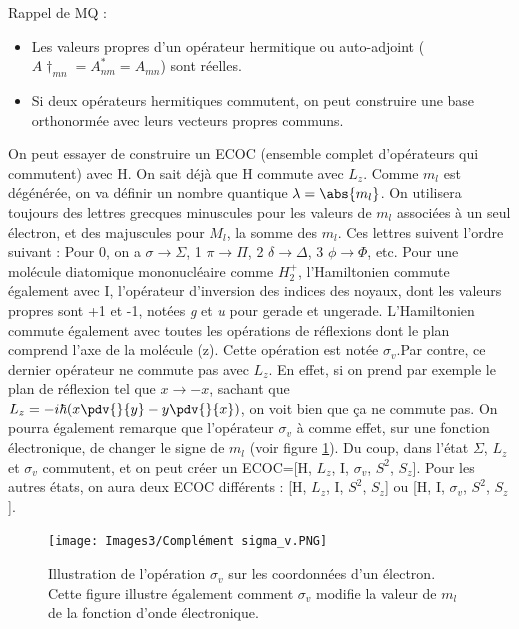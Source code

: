Rappel de MQ :
\begin{itemize}
    \item Les valeurs propres d'un opérateur hermitique ou auto-adjoint ($A\dagger_{mn} = A^*_{nm} = A_{mn}$) sont réelles.
    \item Si deux opérateurs hermitiques commutent, on peut construire une base orthonormée avec leurs vecteurs propres communs.
\end{itemize}
On peut essayer de construire un ECOC (ensemble complet d'opérateurs qui commutent) avec H.\newline
On sait déjà que H commute avec $L_z$. Comme $m_l$ est dégénérée, on va définir un nombre quantique $\lambda = \abs{m_l}$. On utilisera toujours des lettres grecques minuscules pour les valeurs de $m_l$ associées à un seul électron, et des majuscules pour $M_l$, la somme des $m_l$. Ces lettres suivent l'ordre suivant : \newline
Pour 0, on a $\sigma \rightarrow\Sigma$, 1 $\pi\rightarrow\Pi$, 2 $\delta\rightarrow\Delta$, 3 $\phi\rightarrow\Phi$, etc.\newline
Pour une molécule diatomique mononucléaire comme $H_2^+$, l'Hamiltonien commute également avec I, l'opérateur d'inversion des indices des noyaux, dont les valeurs propres sont +1 et -1, notées \textit{g} et \textit{u} pour gerade et ungerade.\newline
L'Hamiltonien commute également avec toutes les opérations de réflexions dont le plan comprend l'axe de la molécule (z). Cette opération est notée $\sigma_v$.Par contre, ce dernier opérateur ne commute pas avec $L_z$. En effet, si on prend par exemple le plan de réflexion tel que $x\rightarrow-x$, sachant que $L_z = -i\hbar(x\pdv{}{y}-y\pdv{}{x})$, on voit bien que ça ne commute pas.\newline
On pourra également remarque que l'opérateur $\sigma_v$ à comme effet, sur une fonction électronique, de changer le signe de $m_l$ (voir figure \ref{fig:sigma_v}). Du coup, dans l'état $\Sigma$, $L_z$ et $\sigma_v$ commutent, et on peut créer un ECOC=[H, $L_z$, I, $\sigma_v$, $S^2$, $S_z$]. Pour les autres états, on aura deux ECOC différents : [H, $L_z$, I, $S^2$, $S_z$] ou [H, I, $\sigma_v$, $S^2$, $S_z$].\newline
\begin{figure}[tpb]
    \centering
    \texttt{[image: Images3/Complément sigma\_v.PNG]}
    \caption{Illustration de l’opération $\sigma_v$ sur les coordonnées d’un électron. Cette figure illustre également comment $\sigma_v$ modifie la valeur de $m_l$ de la fonction d’onde électronique.}
    \label{fig:sigma_v}
\end{figure}
